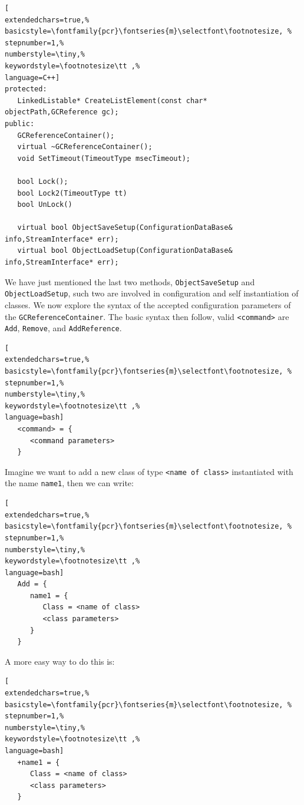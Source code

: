 \begin{lstlisting}[
extendedchars=true,%
basicstyle=\fontfamily{pcr}\fontseries{m}\selectfont\footnotesize, %
stepnumber=1,%
numberstyle=\tiny,%
keywordstyle=\footnotesize\tt ,%
language=C++]
protected:
   LinkedListable* CreateListElement(const char* objectPath,GCReference gc);
public:
   GCReferenceContainer();
   virtual ~GCReferenceContainer();
   void SetTimeout(TimeoutType msecTimeout);

   bool Lock();
   bool Lock2(TimeoutType tt)
   bool UnLock()

   virtual bool ObjectSaveSetup(ConfigurationDataBase& info,StreamInterface* err);
   virtual bool ObjectLoadSetup(ConfigurationDataBase& info,StreamInterface* err);
\end{lstlisting}

We have just mentioned the last two methods, \texttt{ObjectSaveSetup} and \texttt{ObjectLoadSetup}, such two are involved in  configuration and self instantiation of classes. We now explore the syntax of the accepted configuration parameters of the \texttt{GCReferenceContainer}. The basic syntax then follow, valid \texttt{<command>} are \texttt{Add}, \texttt{Remove}, and \texttt{AddReference}.
\begin{lstlisting}[
extendedchars=true,%
basicstyle=\fontfamily{pcr}\fontseries{m}\selectfont\footnotesize, %
stepnumber=1,%
numberstyle=\tiny,%
keywordstyle=\footnotesize\tt ,%
language=bash]
   <command> = {
      <command parameters>
   }
\end{lstlisting}

Imagine we want to add a new class of type \texttt{<name of class>} instantiated with the name \texttt{name1}, then we can write:

\begin{lstlisting}[
extendedchars=true,%
basicstyle=\fontfamily{pcr}\fontseries{m}\selectfont\footnotesize, %
stepnumber=1,%
numberstyle=\tiny,%
keywordstyle=\footnotesize\tt ,%
language=bash]
   Add = {
      name1 = {
         Class = <name of class>
         <class parameters>
      }
   }
\end{lstlisting}

A more easy way to do this is:
\begin{lstlisting}[
extendedchars=true,%
basicstyle=\fontfamily{pcr}\fontseries{m}\selectfont\footnotesize, %
stepnumber=1,%
numberstyle=\tiny,%
keywordstyle=\footnotesize\tt ,%
language=bash]
   +name1 = {
      Class = <name of class>
      <class parameters>
   }
\end{lstlisting}

